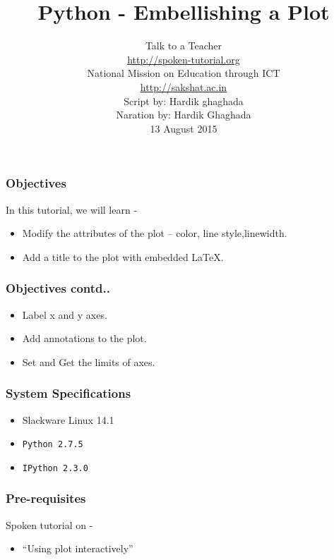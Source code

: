 \documentclass[17pt,compress]{beamer}
\author[FOSSEE]{}
\institute[IIT Bombay]{}
\date[]{}
\begin{document}
\sffamily \bfseries
\title
[Embellishing a Plot]
{Python - Embellishing a Plot}
\author
[FOSSEE, IIT - Bombay]
{\small Talk to a Teacher\\{\color{blue}\url{http://spoken-tutorial.org}}\\National Mission on Education
 through ICT\\{\color{blue}\url{http://sakshat.ac.in}} \\[0.5cm]{\tiny Script by: Hardik ghaghada \\ Naration by: Hardik Ghaghada \\ 13 August 2015}}

\begin{frame}
   \titlepage
\end{frame}
\begin{frame}
\frametitle{Objectives}
\label{sec-2.1}
In this tutorial, we will learn -\pause
\begin{itemize}
\item Modify the attributes of the plot -- color, line style,linewidth.\pause
\item Add a title to the plot with embedded \LaTeX{}.
\end{itemize}
\end{frame}
\begin{frame}
\frametitle{Objectives contd..}
\label{sec-2.2}
\begin{itemize}
\item Label x and y axes.\pause
\item Add annotations to the plot.\pause
\item Set and Get the limits of axes.
\end{itemize}
\end{frame}
\begin{frame}
\frametitle{System Specifications}\pause
\begin{itemize}
\item Slackware Linux 14.1\pause
\item \texttt{Python 2.7.5} \pause
\item \texttt{IPython 2.3.0}
\end{itemize}
\end{frame}
\begin{frame}
\frametitle{Pre-requisites}
Spoken tutorial on  -
\begin{itemize}
\item ``Using plot interactively'' 
\end{itemize}
\end{frame}
\end{document}
